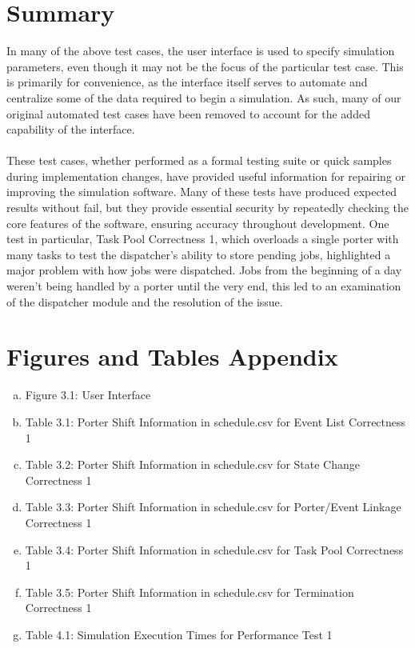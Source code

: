 \documentclass[paper=letter, fontsize=10pt]{scrartcl}
\numberwithin{equation}{section}		%
\numberwithin{figure}{section}			%
\numberwithin{table}{section}				%
\begin{document}
\section{Summary}
In many of the above test cases, the user interface is used to specify simulation parameters, even though it may not be the focus of the particular test case. This is primarily for convenience, as the interface itself serves to automate and centralize some of the data required to begin a simulation. As such, many of our original automated test cases have been removed to account for the added capability of the interface.\\
\\
These test cases, whether performed as a formal testing suite or quick samples during implementation changes, have provided useful information for repairing or improving the simulation software. Many of these tests have produced expected results without fail, but they provide essential security by repeatedly checking the core features of the software, ensuring accuracy throughout development.   One test in particular, Task Pool Correctness 1, which overloads a single porter with many tasks to test the dispatcher's ability to store pending jobs, highlighted a major problem with how jobs were dispatched. Jobs from the beginning of a day weren't being handled by a porter until the very end, this led to an examination of the dispatcher module and the resolution of the issue. 
\section{Figures and Tables Appendix}
\begin{enumerate}[(a)]
	\item Figure 3.1: User Interface
	\item Table  3.1: Porter Shift Information in schedule.csv for Event List Correctness 1
	\item Table  3.2: Porter Shift Information in schedule.csv for State Change Correctness 1
	\item Table  3.3: Porter Shift Information in schedule.csv for Porter/Event Linkage Correctness 1
	\item Table  3.4: Porter Shift Information in schedule.csv for Task Pool Correctness 1
	\item Table  3.5: Porter Shift Information in schedule.csv for Termination Correctness 1
	\item Table  4.1: Simulation Execution Times for Performance Test 1
\end{enumerate}

\end{document}
